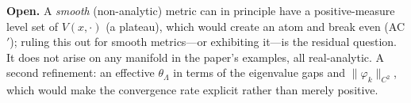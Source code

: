 \documentclass[11pt]{article}
\theoremstyle{remark}
\begin{document}
\medskip
\noindent\textbf{Open.} A \emph{smooth} (non-analytic) metric can in principle have a
positive-measure level set of $V(x,\cdot)$ (a plateau), which would create an atom and
break even (AC$'$); ruling this out for smooth metrics---or exhibiting it---is the residual
question. It does not arise on any manifold in the paper's examples, all real-analytic. A
second refinement: an effective $\theta_\Lambda$ in terms of the eigenvalue gaps and
$\lVert\varphi_k\rVert_{C^2}$, which would make the convergence rate explicit rather than
merely positive.
\end{document}
